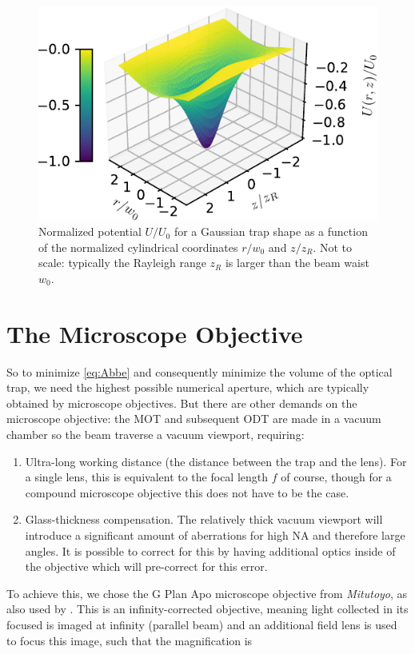 \begin{figure}
    \centering
    \includegraphics[width=.56\linewidth]{figures/GaussianPotential.pdf}
    \caption{Normalized potential $U/U_0$ for a Gaussian trap shape as a function of the normalized cylindrical coordinates $r/w_0$ and $z/z_R$. Not to scale: typically the Rayleigh range $z_R$ is larger than the beam waist $w_0$.}
    \label{fig:GaussianPotential}
\end{figure}



\section{The Microscope Objective}\label{sec:TweezersPractice}

So to minimize \cref{eq:Abbe} and consequently minimize the volume of the optical trap, we need the highest possible numerical aperture, which are typically obtained by microscope objectives. 
But there are other demands on the microscope objective: the \ac{MOT} and subsequent \ac{ODT} are made in a vacuum chamber so the beam traverse a vacuum viewport, requiring:

\begin{enumerate}
    \item Ultra-long working distance (the distance between the trap and the lens). For a single lens, this is equivalent to the focal length $f$ of course, though for a compound microscope objective this does not have to be the case.
    
    \item Glass-thickness compensation. The relatively thick vacuum viewport will introduce a significant amount of aberrations for high NA and therefore large angles. It is possible to correct for this by having additional optics inside of the objective which will pre-correct for this error.
\end{enumerate}
To achieve this, we chose the G Plan Apo microscope objective from \textit{Mitutoyo}, as also used by \cite{Manuel2016,Ebadi2021}. 
This is an infinity-corrected objective, meaning light collected in its focused is imaged at infinity (parallel beam) and an additional field lens is used to focus this image, such that the magnification is 

